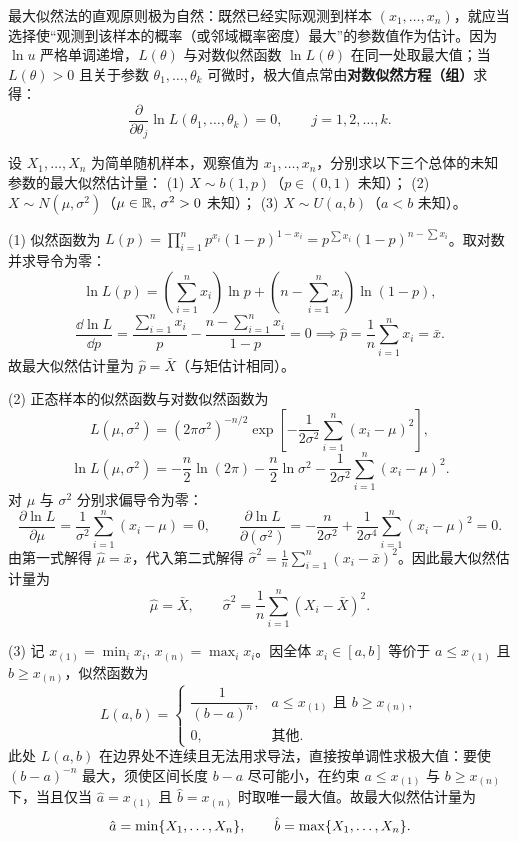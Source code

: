 最大似然法的直观原则极为自然：既然已经实际观测到样本 $(x_1,\ldots,x_n)$，就应当选择使“观测到该样本的概率（或邻域概率密度）最大”的参数值作为估计。因为 $\ln u$ 严格单调递增，$L(\theta)$ 与对数似然函数 $\ln L(\theta)$ 在同一处取最大值；当 $L(\theta)>0$ 且关于参数 $\theta_1,\ldots,\theta_k$ 可微时，极大值点常由\textbf{对数似然方程（组）}求得：
\begin{equation}
  \frac{\partial}{\partial\theta_j}\ln L(\theta_1,\ldots,\theta_k)=0,\qquad j=1,2,\ldots,k.
  \label{eq:log-likelihood-eq}
\end{equation}

\begin{example}[title={两点分布、正态分布与均匀分布的最大似然估计}]
\label{eg:mle-classics}
设 $X_1,\ldots,X_n$ 为简单随机样本，观察值为 $x_1,\ldots,x_n$，分别求以下三个总体的未知参数的最大似然估计量：
(1) $X\sim b(1,p)$（$p\in(0,1)$ 未知）；
(2) $X\sim N(\mu,\sigma^2)$（$\mu\in\mathbb{R},\,\sigma^2>0$ 未知）；
(3) $X\sim U(a,b)$（$a<b$ 未知）。
\begin{solution}
(1) 似然函数为 $L(p)=\prod_{i=1}^{n}p^{x_i}(1-p)^{1-x_i}=p^{\sum x_i}(1-p)^{n-\sum x_i}$。取对数并求导令为零：
\[
  \ln L(p)=\left(\sum_{i=1}^{n}x_i\right)\ln p+\left(n-\sum_{i=1}^{n}x_i\right)\ln(1-p),
\]
\[
  \frac{\dd\ln L}{\dd p}=\frac{\sum_{i=1}^{n}x_i}{p}-\frac{n-\sum_{i=1}^{n}x_i}{1-p}=0
  \implies \hat{p}=\frac{1}{n}\sum_{i=1}^{n}x_i=\bar{x}.
\]
故最大似然估计量为 $\hat{p}=\bar{X}$（与矩估计相同）。

(2) 正态样本的似然函数与对数似然函数为
\[
  L(\mu,\sigma^2)=(2\pi\sigma^2)^{-n/2}\exp\!\left[-\frac{1}{2\sigma^2}\sum_{i=1}^{n}(x_i-\mu)^2\right],
\]
\[
  \ln L(\mu,\sigma^2)=-\frac{n}{2}\ln(2\pi)-\frac{n}{2}\ln\sigma^2-\frac{1}{2\sigma^2}\sum_{i=1}^{n}(x_i-\mu)^2.
\]
对 $\mu$ 与 $\sigma^2$ 分别求偏导令为零：
\[
  \frac{\partial\ln L}{\partial\mu}=\frac{1}{\sigma^2}\sum_{i=1}^{n}(x_i-\mu)=0,\qquad
  \frac{\partial\ln L}{\partial(\sigma^2)}=-\frac{n}{2\sigma^2}+\frac{1}{2\sigma^4}\sum_{i=1}^{n}(x_i-\mu)^2=0.
\]
由第一式解得 $\hat{\mu}=\bar{x}$，代入第二式解得 $\hat{\sigma}^2=\frac{1}{n}\sum_{i=1}^{n}(x_i-\bar{x})^2$。因此最大似然估计量为
\[
  \hat{\mu}=\bar{X},\qquad \hat{\sigma}^2=\frac{1}{n}\sum_{i=1}^{n}(X_i-\bar{X})^2.
\]

(3) 记 $x_{(1)}=\min_i x_i,\,x_{(n)}=\max_i x_i$。因全体 $x_i\in[a,b]$ 等价于 $a\le x_{(1)}$ 且 $b\ge x_{(n)}$，似然函数为
\[
  L(a,b)=
  \begin{cases}
    \dfrac{1}{(b-a)^n},& a\le x_{(1)}\text{ 且 }b\ge x_{(n)},\\
    0,& \text{其他}.
  \end{cases}
\]
此处 $L(a,b)$ 在边界处不连续且无法用求导法，直接按单调性求极大值：要使 $(b-a)^{-n}$ 最大，须使区间长度 $b-a$ 尽可能小，在约束 $a\le x_{(1)}$ 与 $b\ge x_{(n)}$ 下，当且仅当 $\hat{a}=x_{(1)}$ 且 $\hat{b}=x_{(n)}$ 时取唯一最大值。故最大似然估计量为
\[
  \hat{a}=\min\{X_1,\ldots,X_n\},\qquad \hat{b}=\max\{X_1,\ldots,X_n\}.
\]
\end{solution}
\end{example}

